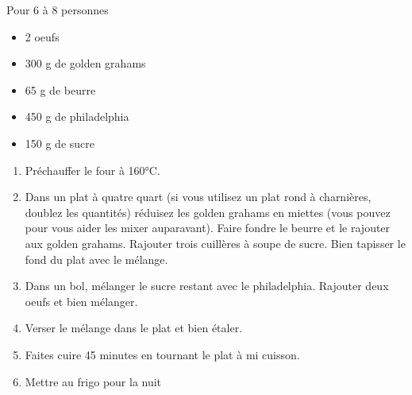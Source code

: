 \bigskip
{}
{Pour 6 à 8 personnes}{
\begin{itemize}
	\item 2 oeufs
	\item 300 g de golden grahams
	\item 65 g de beurre
	\item 450 g de philadelphia
	\item 150 g de sucre
\end{itemize}}
{\begin{enumerate}
	\item Préchauffer le four à 160°C.
   	\item Dans un plat à quatre quart (si vous utilisez un plat rond à charnières, doublez les quantités) réduisez les golden grahams en miettes (vous pouvez pour vous aider les mixer auparavant). Faire fondre le beurre et le rajouter aux golden grahams. Rajouter trois cuillères à soupe de sucre. Bien tapisser le fond du plat avec le mélange.
	\item Dans un bol, mélanger le sucre restant avec le philadelphia. Rajouter deux oeufs et bien mélanger.
    	\item Verser le mélange dans le plat et bien étaler.
	\item Faites cuire 45 minutes en tournant le plat à mi cuisson.
	\item Mettre au frigo pour la nuit
\end{enumerate}}

